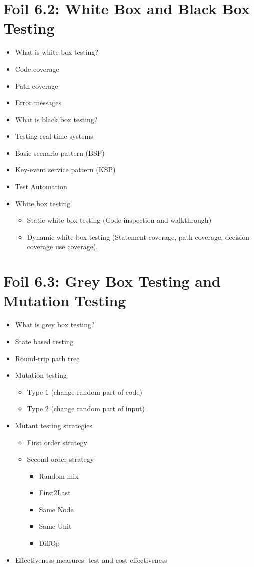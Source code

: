	\section{Foil 6.2: White Box and Black Box Testing}
		\begin{itemize}
			\item What is white box testing?
			\item Code coverage
			\item Path coverage
			\item Error messages
			\item What is black box testing?
			\item Testing real-time systems
			\item Basic scenario pattern (BSP)
			\item Key-event service pattern (KSP)
			\item Test Automation
			\item White box testing
				\begin{itemize}
					\item Static white box testing (Code inspection and walkthrough)
					\item Dynamic white box testing (Statement coverage, path coverage, decision coverage
					use coverage).
				\end{itemize}
		\end{itemize}

	\section{Foil 6.3: Grey Box Testing and Mutation Testing}
		\begin{itemize}
			\item What is grey box testing?
			\item State based testing
			\item Round-trip path tree
			\item Mutation testing
				\begin{itemize}
					\item Type 1 (change random part of code)
					\item Type 2 (change random part of input)
				\end{itemize}
			\item Mutant testing strategies
				\begin{itemize}
					\item First order strategy
					\item Second order strategy
						\begin{itemize}
							\item Random mix
							\item First2Last
							\item Same Node
							\item Same Unit
							\item DiffOp
						\end{itemize}
				\end{itemize}
			\item Effectiveness measures: test and cost effectiveness
		\end{itemize}


